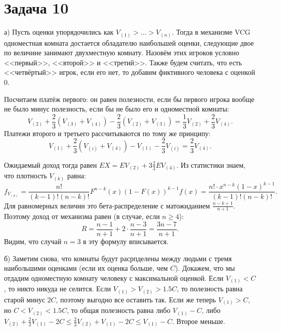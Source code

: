 \documentclass{article}
\theoremstyle{definition}
\theoremstyle{remark}
\renewcommand{\le}{\leqslant}
\renewcommand{\ge}{\geqslant}
\begin{document}
\section*{Задача 10}

а) Пусть оценки упорядочились как $V_{(1)} > \ldots > V_{(n)}$. Тогда в механизме VCG одноместная
комната достается обладателю наибольшей оценки, следующие двое по величине занимают двухместную
комнату. Назовём этих игроков условно <<первый>>, <<второй>> и <<третий>>. Также будем считать, что
есть <<четвёртый>> игрок, если его нет, то добавим фиктивного человека с оценкой 0.

Посчитаем платёж первого: он равен полезности, если бы первого игрока вообще не было минус
полезность, если бы не было его и одноместной комнаты:
$$ V_{(2)} + \frac{2}{3}(V_{(3)} + V_{(4)}) - \frac{2}{3}(V_{(2)} + V_{(3)}) = \frac{1}{3} V_{(2)} +
\frac{2}{3} V_{(4)}. $$
Платежи второго и третьего рассчитываются по тому же принципу:
$$ V_{(1)} + \frac{2}{3}(V_{(i)} + V_{(4)}) - V_{(1)} - \frac{2}{3}V_{(i)} = \frac{2}{3}V_{(4)}. $$

Ожидаемый доход тогда равен $EX = EV_{(2)} + 3\frac{2}{3}EV_{(4)}$. Из статистики знаем, что
плотность $V_{(k)}$ равна:
$$ f_{V_{(k)}} = \frac{n!}{(k-1)!(n-k)!} F^{n-k}(x) (1 - F(x))^{k-1} f(x) =
\frac{n! \cdot x^{n-k} (1-x)^{k-1}}{(k-1)!(n-k)!}. $$
Для равномерных величин это бета-распределение с матожиданием $\frac{n-k+1}{n+1}$. Поэтому доход от
механизма равен (в случае, если $n \ge 4$):
$$ R = \frac{n-1}{n+1} + 2\cdot \frac{n-3}{n+1} = \frac{3n-7}{n+1}. $$
Видим, что случай $n = 3$ в эту формулу вписывается.

б) Заметим снова, что комнаты будут расрпделены между людьми с тремя наибольшими оценками (если их
оценка больше, чем $C$). Докажем, что мы отдадим одноместную комнату человеку с максимальной
оценкой. Если $V_{(1)} < C$, то никто никуда не селится. Если $V_{(1)} > V_{(2)} > 1.5C$, то
полезность равна старой минус $2C$, поэтому выгодно все оставить так. Если же теперь $V_{(1)} > C$,
но $C < V_{(2)} < 1.5C$, то общая полезность равна либо $V_{(1)} - C$, либо $V_{(2)} + \frac{2}{3}
V_{(1)} - 2C \le \frac{2}{3}V_{(2)} + V_{(1)} - 2C \le V_{(1)} - C$. Второе меньше.
\end{document}
